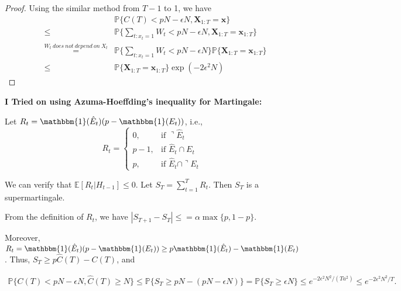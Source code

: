 \begin{proof}
Using the similar method from $T-1$ to 1, we have
\begin{eqnarray}
&&\mathbb{P}\{C(T) < pN - \epsilon N, \boldsymbol{X}_{1:T} = \boldsymbol{x}\} \nonumber\\
& \leq &\mathbb{P}\{\sum_{t: x_t = 1} W_t  < pN - \epsilon N, \boldsymbol{X}_{1:T} = \boldsymbol{x}_{1:T}\} \nonumber \\
&\overset{W_t~does~not~depend~on~X_t}{  =}&\mathbb{P}\{\sum_{t: x_t = 1} W_t  < pN - \epsilon N\}\mathbb{P}\{\boldsymbol{X}_{1:T} = \boldsymbol{x}_{1:T}\}\nonumber \\
&\leq& \mathbb{P}\{\boldsymbol{X}_{1:T} = \boldsymbol{x}_{1:T}\} \exp(-2\epsilon^2 N)
\end{eqnarray}

\end{proof}

\textbf{I Tried on using Azuma-Hoeffding's inequality for Martingale:}

Let $R_t = \mathbbm{1}(\hat{E}_t)(p - \mathbbm{1}(E_t))$, i.e.,
\begin{equation}
R_t = \begin{cases}
0,&\text{if $\urcorner \hat{E}_t$}\\
p-1, &\text{if $\hat{E}_t \cap E_t$}\\
p,&\text{if $\hat{E}_t \cap \urcorner E_t$}
\end{cases}
\end{equation}

We can verify that $\mathbb{E}[R_t|H_{t-1}] \leq 0$. Let $S_T = \sum_{t = 1}^T R_t$. Then $S_T$ is a supermartingale.

From the definition of $R_t$, we have $|S_{T+1} - S_T| \leq = \alpha \max\{p, 1-p\}$.

Moreover, $R_t = \mathbbm{1}(\hat{E}_t)(p - \mathbbm{1}(E_t)) \geq p \mathbbm{1}(\hat{E}_t) - \mathbbm{1}(E_t)$. Thus, $S_T \geq p \hat{C}(T) - C(T)$, and

\begin{eqnarray}
\mathbb{P}\{C(T) < pN - \epsilon N, \hat{C}(T) \geq N\} \leq  \mathbb{P}\{S_T \geq pN - (pN - \epsilon N)\} = \mathbb{P}\{S_T \geq \epsilon N\} \leq e^{-2\epsilon^2 N^2/(T a^2)} \leq e^{-2\epsilon^2 N^2/T}.
\end{eqnarray}



